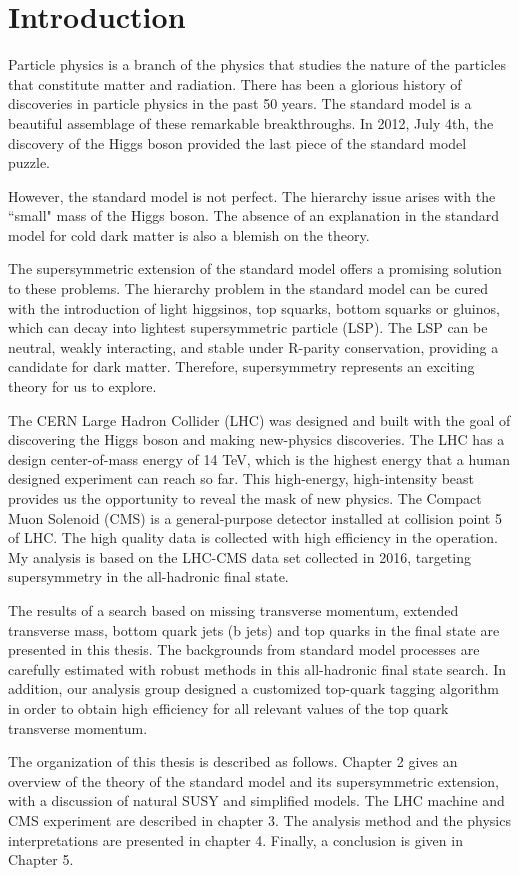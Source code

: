 \chapter{Introduction}
Particle physics is a branch of the physics that studies the nature of the particles that constitute matter and radiation. There has been a glorious history of discoveries in particle physics in the past 50 years. The standard model is a beautiful assemblage of these remarkable breakthroughs. In 2012, July 4th, the discovery of the Higgs boson provided the last piece of the standard model puzzle.

However, the standard model is not perfect. The hierarchy issue arises with the ``small" mass of the Higgs boson. The absence of an explanation in the standard model for cold dark matter is also a blemish on the theory.

The supersymmetric extension of the standard model offers a promising solution to these problems. The hierarchy problem in the standard model can be cured with the introduction of light higgsinos, top squarks, bottom squarks or gluinos, which can decay into lightest supersymmetric particle (LSP). The LSP can be neutral, weakly interacting, and stable under R-parity\cite{Farrar:1978xj} conservation, providing a candidate for dark matter. Therefore, supersymmetry represents an exciting theory for us to explore.

The CERN Large Hadron Collider (LHC) was designed and built with the goal of discovering the Higgs boson and making new-physics discoveries. The LHC has a design center-of-mass energy of 14 TeV, which is the highest energy that a human designed experiment can reach so far. This high-energy, high-intensity beast provides us the opportunity to reveal the mask of new physics. The Compact Muon Solenoid (CMS) is a general-purpose detector installed at collision point 5 of LHC. The high quality data is collected with high efficiency in the operation. My analysis is based on the LHC-CMS data set collected in 2016, targeting supersymmetry in the all-hadronic final state.

The results of a search based on missing transverse momentum, extended transverse mass, bottom quark jets (b jets) and top quarks in the final state are presented in this thesis. The backgrounds from standard model processes are carefully estimated with robust methods in this all-hadronic final state search. In addition, our analysis group designed a customized top-quark tagging algorithm in order to obtain high efficiency for all relevant values of the top quark transverse momentum.

The organization of this thesis is described as follows. Chapter 2 gives an overview of the theory of the standard model and its supersymmetric extension, with a discussion of natural SUSY and simplified models. The LHC machine and CMS experiment are described in chapter 3. The analysis method and the physics interpretations are presented in chapter 4. Finally, a conclusion is given in Chapter 5.

